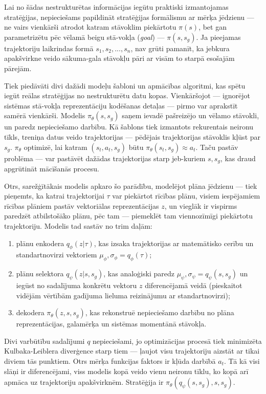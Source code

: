 \documentclass[12pt, a4paper]{article}
\numberwithin{equation}{section} %
\begin{document}
Lai no šādas nestrukturētas informācijas iegūtu praktiski izmantojamas stratēģijas, nepieciešams papildināt stratēģijas formālismu ar mērķa jēdzienu --- ne vairs vienkārši atrodot katram stāvoklim piekārtotu $\pi(s)$, bet gan parametrizētu pēc vēlamā beigu stā-vokļa (\textit{goal}) --- $\pi(s,s_{g})$. Ja pieejamas trajektoriju laikrindas formā $s_1, s_2, ..., s_n$, nav grūti pamanīt, ka jebkura apakšvirkne veido sākuma-gala stāvokļu pāri ar visām to starpā esošajām pārejām.

Tiek piedāvāti divi dažādi modeļu šabloni un apmācības algoritmi, kas spētu iegūt reālas stratēģijas no nestrukturētu datu kopas. Vienkāršojot --- ignorējot sistēmas stā-vokļa reprezentāciju kodēšanas detaļas --- pirmo var aprakstīt samērā vienkārši. Modelis $\pi_{\theta}(s,s_g)$ saņem ievadē pašreizējo un vēlamo stāvokli, un paredz nepieciešamo darbību. Kā šablons tiek izmantots rekurentais neironu tīkls, treniņa datus veido trajektorijas --- pēdējais trajektorijas stāvoklis kļūst par $s_g$. $\pi_{\theta}$ optimizē, lai katram $(s_t, a_t, s_g)$ būtu $\pi_{\theta}(s_t, s_g) \approx a_t$. Taču pastāv problēma --- var pastāvēt dažādas trajektorijas starp jeb-kuriem $s, s_g$, kas draud apgrūtināt mācīšanās procesu.

Otrs, sarežģītākais modelis apkaro šo parādību, modelējot plāna jēdzienu --- tiek pieņemts, ka katrai trajektorijai $\tau$ var piekārtot rīcības plānu, visiem iespējamiem rīcības plāniem pastāv vektoriālas reprezentācijas $z$, un vieglāk ir vispirms paredzēt atbilstošāko plānu, pēc tam --- piemeklēt tam viennozīmīgi piekārtotu trajektoriju. Modelis tad sastāv no trim daļām:

\begin{enumerate}
    \item plānu enkodera $q_{\phi}(z \vert \tau)$, kas izsaka trajektorijas ar matemātisko cerību un standartnovirzi vektoriem $\mu_{\phi}, \sigma_{\phi} = q_{\phi}(\tau)$;
    \item plānu selektora $q_{\psi}(z \vert s, s_g)$, kas analoģiski paredz $\mu_{\psi}, \sigma_{\psi} = q_{\psi}(s, s_g)$ un iegūst no sadalījuma konkrētu vektoru $z$ diferencējamā veidā (pieskaitot vidējām vērtībām gadījuma lieluma reizinājumu ar standartnovirzi);
    \item dekodera $\pi_{\theta}(z, s, s_g)$, kas rekonstruē nepieciešamo darbību no plāna reprezentācijas, galamērķa un sistēmas momentānā stāvokļa.
\end{enumerate}

Divi varbūtību sadalījumi $q$ nepieciešami, jo optimizācijas procesā tiek minimizēta Kulbaka-Leiblera diverģence starp tiem --- ļaujot visu trajektoriju aizstāt ar tikai diviem tās punktiem. Otrs mērķa funkcijas faktors ir kļūda darbībā $a_t$. Tā kā visi slāņi ir diferencējami, viss modelis kopā veido vienu neironu tīklu, ko kopā arī apmāca uz trajektoriju apakšvirknēm. Stratēģija ir $\pi_{\theta}(q_{\psi}(s, s_g), s, s_g)$.
\end{document}
